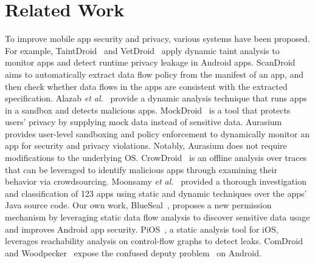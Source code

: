 \section{Related Work}
\label{sec:related}

To improve mobile app security and privacy, various systems have been proposed.
For example, TaintDroid~\cite{TaintDroid} and VetDroid~\cite{VetDroid} apply
dynamic taint analysis to monitor apps and detect runtime privacy leakage in
Android apps. ScanDroid~\cite{ScanDroid} aims to automatically extract data flow
policy from the manifest of an app, and then check whether data flows in the
apps are consistent with the extracted specification. Alazab {\em et
al.}~\cite{Alazab:2012:AMB} provide a dynamic analysis technique that runs apps
in a sandbox and detects malicious apps. MockDroid~\cite{Beresford:2011:MTP} is
a tool that protects users' privacy by supplying mock data instead of sensitive
data. Aurasium~\cite{Xu:Security:2012} provides user-level sandboxing and policy
enforcement to dynamically monitor an app for security and privacy violations.
Notably, Aurasium does not require modifications to the underlying OS.
CrowDroid~\cite{Burguera:2011:CBM} is an offline analysis over traces that can
be leveraged to identify malicious apps through examining their behavior via
crowdsourcing. Moonsamy {\em et al.}~\cite{Moonsamy:2012:TUI} provided a
thorough investigation and classification of 123 apps using static and dynamic
techniques over the apps' Java source code. Our own work,
BlueSeal~\cite{Blueseal}, proposes a new permission mechanism by leveraging
static data flow analysis to discover sensitive data usage and improves Android
app security. PiOS~\cite{DBLP:conf/ndss/EgeleKKV11}, a static analysis tool for
iOS, leverages reachability analysis on control-flow graphs to detect leaks.
ComDroid~\cite{ComDroid} and Woodpecker~\cite{Woodpecker} expose the confused
deputy problem~\cite{Deputy} on Android.


